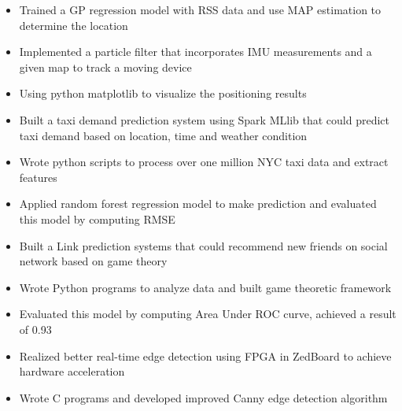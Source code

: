 \documentclass{resume}
\begin{document}

\begin{itemize}
  \item Trained a GP regression model with RSS data and use MAP estimation to determine the location
  \item  Implemented a particle filter that incorporates IMU measurements and a given map to track a moving device
  \item Using python matplotlib to visualize the positioning results
\end{itemize}


\begin{itemize}
  \item Built a taxi demand prediction system using Spark MLlib that could predict taxi demand based on location, time and weather condition
  \item Wrote python scripts to process over one million NYC taxi data and extract features
  \item Applied random forest regression model to make prediction and evaluated this model by computing RMSE
\end{itemize}

\begin{itemize}
    \item Built a Link prediction systems that could recommend new friends on social network based on game theory
    \item Wrote Python programs to analyze data and built game theoretic framework
    \item Evaluated this model by computing Area Under ROC curve, achieved a result of 0.93
\end{itemize}

\begin{itemize}
    \item Realized better real-time edge detection using FPGA in ZedBoard to achieve hardware acceleration
    \item Wrote C programs and developed improved  Canny edge detection algorithm
\end{itemize}

\end{document}

